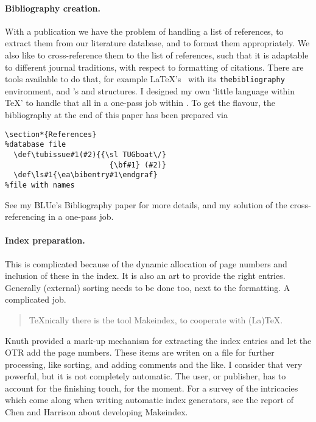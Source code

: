 \paragraph*{Bibliography creation.}%
With a publication we have the problem of
handling a list of references,
to extract them from our literature database,
and to format them appropriately.
We also like to cross-reference them to the list of references,
such that it is adaptable to different journal traditions,
with respect to formatting of citations.
There are tools available to do that, for example
\LaTeX's \BibTeX\ with its {\tt thebibliography} environment, and
\AmSTeX's  and  structures.
I designed my own `little language
within \TeX' to handle that all in a one-pass job within \AllTeX.
To get the flavour, the bibliography at the end of this paper
has been prepared via
\begingroup\small\begin{verbatim}
\section*{References}
%database file
  \def\tubissue#1(#2){{\sl TUGboat\/}
                        {\bf#1} (#2)}
  \def\ls#1{\ea\bibentry#1\endgraf}
%file with names
\end{verbatim}\endgroup
See my BLUe's Bibliography paper
for more details, and my solution of the cross-referencing in a one-pass job.

\paragraph*{Index preparation.}
This is complicated because of the dynamic allocation of page numbers
and inclusion of these in the index. It is also an art to provide the
right entries. Generally (external) sorting needs to be done too,
next to the formatting. A complicated job.
\begin{quote}\TeX nically
   there is the tool Makeindex, to cooperate with (La)\TeX.
\end{quote}
Knuth provided a mark-up mechanism for extracting
the index entries and let the OTR add the page numbers.
These items are writen on a file
for further processing, like sorting, and adding comments and the like.
I consider that very powerful, but it is not completely automatic.
The user, or publisher, has to account for the finishing touch, for the
moment. For a survey of the intricacies which come along
when writing automatic index generators, see
the report of Chen and Harrison about developing Makeindex.

